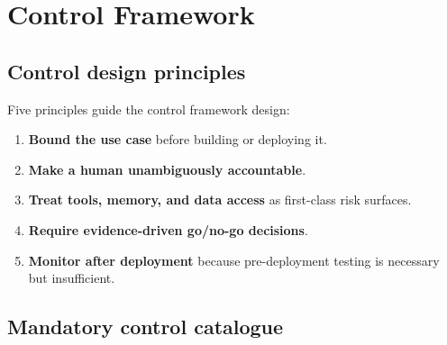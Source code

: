 \chapter{Control Framework}
\label{ch:controls}

\section{Control design principles}

Five principles guide the control framework design:

\begin{enumerate}
  \item \textbf{Bound the use case} before building or deploying it.
  \item \textbf{Make a human unambiguously accountable}.
  \item \textbf{Treat tools, memory, and data access} as first-class risk surfaces.
  \item \textbf{Require evidence-driven go/no-go decisions}.
  \item \textbf{Monitor after deployment} because pre-deployment testing is
        necessary but insufficient.
\end{enumerate}

\section{Mandatory control catalogue}

